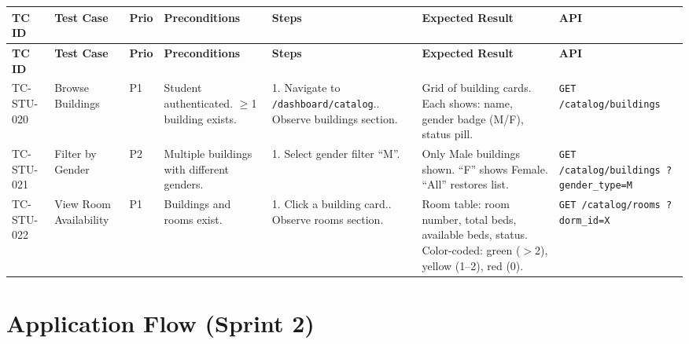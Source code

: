 \documentclass[12pt,a4paper]{article}
\begin{document}
\begin{longtable}{L{2cm} L{3cm} L{1cm} L{4cm} L{5.5cm} L{5.5cm} L{3cm}}
\toprule
\textbf{TC ID} & \textbf{Test Case} & \textbf{Prio} & \textbf{Preconditions} & \textbf{Steps} & \textbf{Expected Result} & \textbf{API} \\
\midrule
\endfirsthead
\toprule
\textbf{TC ID} & \textbf{Test Case} & \textbf{Prio} & \textbf{Preconditions} & \textbf{Steps} & \textbf{Expected Result} & \textbf{API} \\
\midrule
\endhead
\bottomrule
\endfoot

TC-STU-020
& Browse Buildings
& P1
& Student authenticated. $\geq$1 building exists.
& 1. Navigate to \texttt{/dashboard/catalog}.. Observe buildings section.
& Grid of building cards. Each shows: name, gender badge (M/F), status pill.
& \texttt{GET /catalog/buildings}
\\
\midrule

TC-STU-021
& Filter by Gender
& P2
& Multiple buildings with different genders.
& 1. Select gender filter ``M''.
& Only Male buildings shown. ``F'' shows Female. ``All'' restores list.
& \texttt{GET /catalog/buildings ?gender\_type=M}
\\
\midrule

TC-STU-022
& View Room Availability
& P1
& Buildings and rooms exist.
& 1. Click a building card.. Observe rooms section.
& Room table: room number, total beds, available beds, status. Color-coded: green ($>$2), yellow (1--2), red (0).
& \texttt{GET /catalog/rooms ?dorm\_id=X}
\\

\end{longtable}


\section{Application Flow (Sprint 2)}
\end{document}
